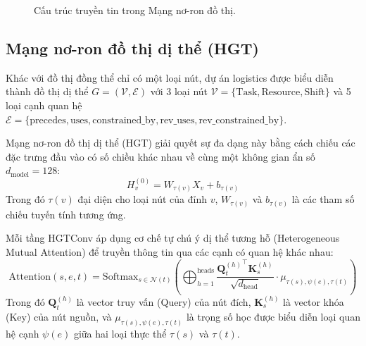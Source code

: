 \begin{figure}[H]
    \caption{Cấu trúc truyền tin trong Mạng nơ-ron đồ thị.}
    \label{fig:1.8}
\end{figure}

\subsection{Mạng nơ-ron đồ thị dị thể (HGT)}
Khác với đồ thị đồng thể chỉ có một loại nút, dự án logistics được biểu diễn thành đồ thị dị thể $G = (\mathcal{V}, \mathcal{E})$ với 3 loại nút $\mathcal{V} = \{\text{Task}, \text{Resource}, \text{Shift}\}$ và 5 loại cạnh quan hệ $\mathcal{E} = \{\text{precedes}, \text{uses}, \text{constrained\_by}, \text{rev\_uses}, \text{rev\_constrained\_by}\}$. 

Mạng nơ-ron đồ thị dị thể (HGT) \cite{hu2020hgt} giải quyết sự đa dạng này bằng cách chiếu các đặc trưng đầu vào có số chiều khác nhau về cùng một không gian ẩn số $d_{\text{model}} = 128$:
\begin{equation}
    H_v^{(0)} = W_{\tau(v)} X_v + b_{\tau(v)}
\end{equation}
Trong đó $\tau(v)$ đại diện cho loại nút của đỉnh $v$, $W_{\tau(v)}$ và $b_{\tau(v)}$ là các tham số chiếu tuyến tính tương ứng.

Mỗi tầng HGTConv áp dụng cơ chế tự chú ý dị thể tương hỗ (Heterogeneous Mutual Attention) để truyền thông tin qua các cạnh có quan hệ khác nhau:
\begin{equation}
    \text{Attention}(s, e, t) = \mathrm{Softmax}_{s \in \mathcal{N}(t)} \left( \bigoplus_{h=1}^{\text{heads}} \frac{{\mathbf{Q}_t^{(h)}}^\top \mathbf{K}_s^{(h)}}{\sqrt{d_{\text{head}}}} \cdot \mu_{\tau(s), \psi(e), \tau(t)} \right)
\end{equation}
Trong đó $\mathbf{Q}_t^{(h)}$ là vector truy vấn (Query) của nút đích, $\mathbf{K}_s^{(h)}$ là vector khóa (Key) của nút nguồn, và $\mu_{\tau(s), \psi(e), \tau(t)}$ là trọng số học được biểu diễn loại quan hệ cạnh $\psi(e)$ giữa hai loại thực thể $\tau(s)$ và $\tau(t)$.

